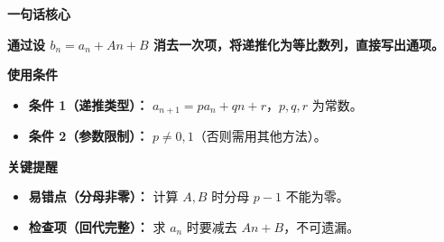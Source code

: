 \begin{summarybox}
	\textbf{\textcolor{CSummary}{一句话核心}}

	\textbf{通过设 $b_n=a_n+An+B$ 消去一次项，将递推化为等比数列，直接写出通项。}

	\medskip
	\textbf{\textcolor{CSummary}{使用条件}}
	\begin{itemize}[leftmargin=*, itemsep=0.5em, topsep=0.4em]
		\item \textbf{条件 1（递推类型）：} $a_{n+1}=p a_n+q n+r$，$p,q,r$ 为常数。
		\item \textbf{条件 2（参数限制）：} $p\neq0,1$（否则需用其他方法）。
	\end{itemize}

	\medskip
	\textbf{\textcolor{CSummary}{关键提醒}}
	\begin{itemize}[leftmargin=*, itemsep=0.5em, topsep=0.4em]
		\item \textbf{易错点（分母非零）：} 计算 $A,B$ 时分母 $p-1$ 不能为零。
		\item \textbf{检查项（回代完整）：} 求 $a_n$ 时要减去 $An+B$，不可遗漏。
	\end{itemize}
\end{summarybox}
